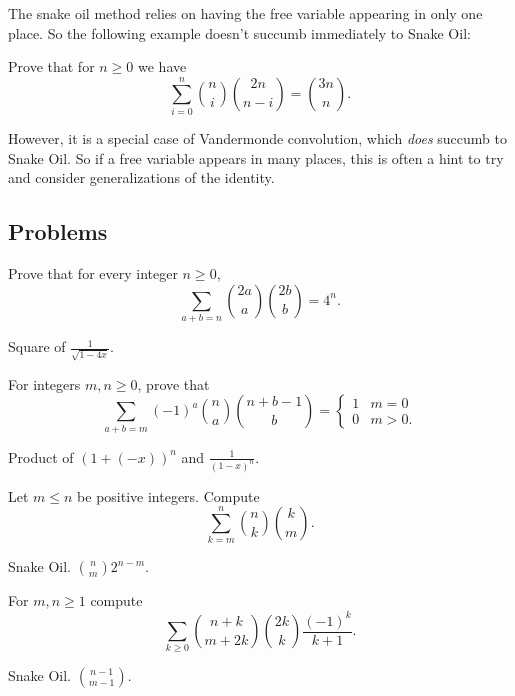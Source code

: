 \documentclass[11pt]{scrartcl}
\begin{document}
The snake oil method relies on having the free variable appearing in only one place.
So the following example doesn't succumb immediately to Snake Oil:
\begin{mdframed}
  Prove that for $n \ge 0$ we have
  \[ \sum_{i=0}^n \binom ni \binom{2n}{n-i} = \binom{3n}{n}. \]
\end{mdframed}
However, it is a special case of Vandermonde convolution,
which \emph{does} succumb to Snake Oil.
So if a free variable appears in many places,
this is often a hint to try and consider generalizations of the identity.

\subsection{Problems}
\begin{problem}
  Prove that for every integer $n \ge 0$,
  \[ \sum_{a+b=n} \binom{2a}{a} \binom{2b}{b} = 4^n. \]
  \begin{hint}
    Square of $\frac{1}{\sqrt{1-4x}}$.
  \end{hint}
\end{problem}

\begin{problem}
  For integers $m,n \ge 0$, prove that
  \[ \sum_{a+b=m} (-1)^a \binom na \binom{n+b-1}{b} =
    \begin{cases}
      1 & m = 0 \\
      0 & m > 0.
    \end{cases}
  \]
  \begin{hint}
    Product of $(1+(-x))^n$ and $\frac{1}{(1-x)^n}$.
  \end{hint}
\end{problem}

\begin{problem}
  Let $m \le n$ be positive integers.
  Compute \[ \sum_{k=m}^n \binom nk \binom km.  \]
  \begin{hint}
    Snake Oil. $\binom nm 2^{n-m}$.
  \end{hint}
\end{problem}

\begin{problem}
  For $m,n \ge 1$ compute
  \[ \sum_{k \ge 0} \binom{n+k}{m+2k}
    \binom{2k}{k} \frac{(-1)^k}{k+1}. \]
  \begin{hint}
    Snake Oil. $\binom{n-1}{m-1}$.
  \end{hint}
\end{problem}
\end{document}
